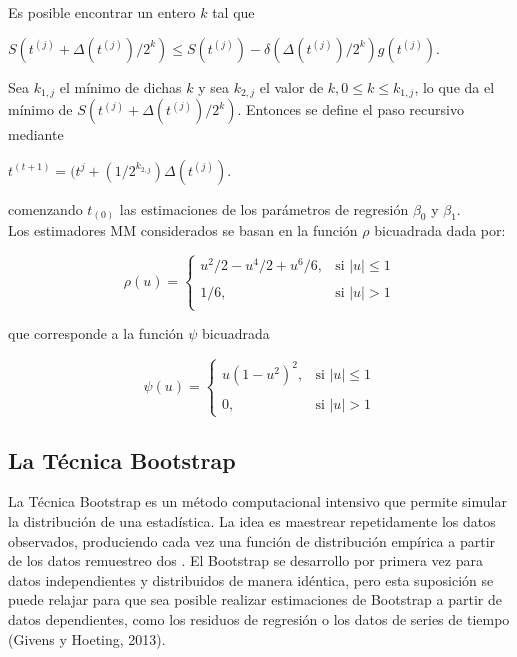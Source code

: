 Es posible encontrar un entero $k$ \parencite{yohai-1987} tal que\\

\begin{center}
	$ S(t^{(j)} + \Delta(t^{(j)} )/2^{k}) \leq S(t^{(j)}) - \delta( \Delta(t^{(j)} )/2^{k} ) g(t^{(j)})$. \\
\end{center}


Sea $k_{1,j}$ el mínimo de dichas $k$ y sea $k_{2,j}$ el valor de $k, 0 \leq k  \leq k_{1,j}$, lo que da el mínimo de $S(t^{(j)} + \Delta(t^{(j)} )/2^{k})$. Entonces se define el paso recursivo mediante\\

\begin{center}
	$ t^{(t+1)} = (t^{j} + (1/2^{k_{2,j}}) \Delta(t^{(j)} )$.\\
\end{center}

comenzando $t_{(0)} $ las estimaciones de los parámetros de regresión $\beta_{0}$ y $\beta_{1}$.\\

Los estimadores MM considerados se basan en la función $\rho$ bicuadrada dada por:


\[
\rho(u) =
\begin{cases}
	u^{2}/2 -u^{4}/2 + u^{6}/6	, & \text{si } |u| \leq 1 \\ \\
	1/6,     & \text{si } | u | > 1\\
\end{cases}
\]


que corresponde a la función $\psi$ bicuadrada

\[
\psi(u) =
\begin{cases}
	u(1- u^{2})^{2}	, & \text{si } |u| \leq 1 \\ \\
	0,     & \text{si } | u | > 1
\end{cases}
\]



\subsection{La Técnica Bootstrap}

La Técnica Bootstrap es un método computacional intensivo que permite simular la distribución de una estadística. La idea es maestrear repetidamente los datos observados, produciendo cada vez una función de distribución empírica a partir de los datos remuestreo dos \parencite{zacarias-2023}. El Bootstrap se desarrollo por primera vez para datos independientes y distribuidos de manera idéntica, pero esta suposición se puede relajar para que sea posible realizar
estimaciones de Bootstrap a partir de datos dependientes, como los residuos de regresión o los datos de series de tiempo (Givens y Hoeting, 2013).\\


